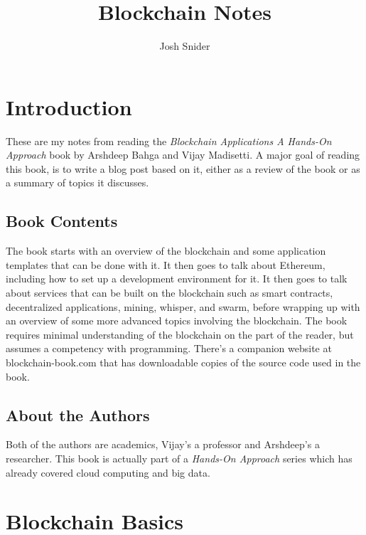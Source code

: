 \documentclass{article}
\begin{document}
\title{Blockchain Notes}
\author{Josh Snider}

\maketitle


\section{Introduction}
These are my notes from reading the \textit{Blockchain Applications A Hands-On Approach} book by Arshdeep Bahga and Vijay Madisetti. A major goal of reading this book, is to write a blog post based on it, either as a review of the book or as a summary of topics it discusses.

\subsection{Book Contents}
The book starts with an overview of the blockchain and some application templates that can be done with it. It then goes to talk about Ethereum, including how to set up a development environment for it. It then goes to talk about services that can be built on the blockchain such as smart contracts, decentralized applications, mining, whisper, and swarm, before wrapping up with an overview of some more advanced topics involving the blockchain. The book requires minimal understanding of the blockchain on the part of the reader, but assumes a competency with programming. There's a companion website at blockchain-book.com that has downloadable copies of the source code used in the book.

\subsection{About the Authors}

Both of the authors are academics, Vijay's a professor and Arshdeep's a researcher. This book is actually part of a \textit{Hands-On Approach} series which has already covered cloud computing and big data.

\section{Blockchain Basics}
\end{document}
